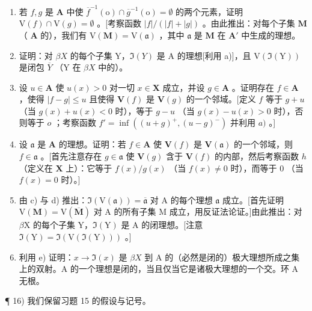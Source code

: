 \begin{enumerate}
\def\labelenumi{\alph{enumi})}
\item
  若 \(f, g\) 是 \(\mathbf{A}\) 中使 \(\overline{f}^{-1}(\mathrm{o}) \cap \overline{g}^{-1}(\mathrm{o}) = \emptyset\) 的两个元素，证明 \(\mathrm{V}(f) \cap \mathrm{V}(g) = \emptyset\) 。{[}考察函数 \(|f| / (|f| + |g|)\) 。由此推出：对每个子集 \(\mathbf{M}\) （ \(\mathbf{A}\) 的），我们有 \(\mathrm{V}(\mathbf{M}) = \mathrm{V}(\mathfrak{a})\) ，其中 \(\mathfrak{a}\) 是 \(\mathbf{M}\) 在 \(\mathbf{A}'\) 中生成的理想。
\item
  证明：对 \(\beta X\) 的每个子集 Y，\(\Im(Y)\) 是 A 的理想{[}利用 a){]}，且 \(\mathrm{V}(\Im(\mathrm{Y}))\) 是闭包 \(\overline{Y}\) （Y 在 \(\beta X\) 中的）。
\item
  设 \(u \in \mathbf{A}\) 使 \(u(x) > 0\) 对一切 \(x \in \mathbf{X}\) 成立，并设 \(g \in \mathbf{A}\) 。证明存在 \(f \in \mathbf{A}\) ，使得 \(|f - g| \leqslant u\) 且使得 \(\mathbf{V}(f)\) 是 \(\mathbf{V}(g)\) 的一个邻域。{[}定义 \(f\) 等于 \(g + u\) （当 \(g(x) + u(x) < 0\) 时），等于 \(g - u\) （当 \(g(x) - u(x) > 0\) 时），否则等于 \(o\) ；考察函数 \(f' = \inf ((u + g)^+, (u - g)^-)\) 并利用 \(a)\) 。{]}
\item
  设 \(\mathfrak{a}\) 是 \(\mathbf{A}\) 的理想。证明：若 \(f\in\mathbf{A}\) 使 \(\mathbf{V}(f)\) 是 \(\mathbf{V}(\mathfrak{a})\) 的一个邻域，则 \(f\in\mathfrak{a}\) 。{[}首先注意存在 \(g \in \mathfrak{a}\) 使 \(\mathbf{V}(g)\) 含于 \(\mathbf{V}(f)\) 的内部，然后考察函数 \(h\) （定义在 \(\mathbf{X}\) 上）：它等于 \(f(x) / g(x)\) （当 \(f(x) \neq 0\) 时），而等于 \(0\) （当 \(f(x) = 0\) 时）。{]}
\item
  由 c) 与 d) 推出：\(\Im(\mathrm{V}(\mathfrak{a})) = \overline{\mathfrak{a}}\) 对 A 的每个理想 \(\mathfrak{a}\) 成立。{[}首先证明 \(\mathrm{V}(\mathbf{M}) = \mathrm{V}(\overline{\mathbf{M}})\) 对 A 的所有子集 M 成立，用反证法论证。{]}由此推出：对 \(\beta\mathrm{X}\) 的每个子集 Y，\(\Im(\mathrm{Y})\) 是 A 的闭理想。{[}注意 \(\Im(\mathrm{Y}) = \Im(\mathrm{V}(\Im(\mathrm{Y})))\) 。{]}
\item
  利用 e) 证明：\(x \to \Im(x)\) 是 \(\beta X\) 到 A 的（必然是闭的）极大理想所成之集上的双射。A 的一个理想是闭的，当且仅当它是诸极大理想的一个交。环 A 无根。
\end{enumerate}

¶ 16) 我们保留习题 15 的假设与记号。

